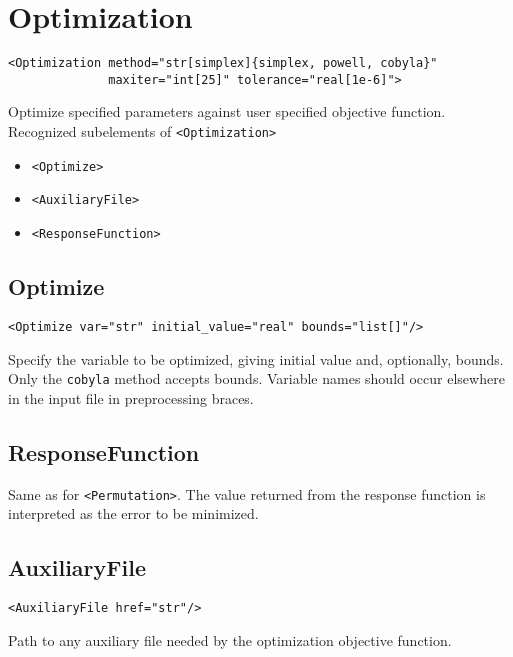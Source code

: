 \documentclass[11pt]{report}
\renewcommand{\tag}[1]{\texttt{<#1>}}
\begin{document}
\section{Optimization}
\begin{verbatim}
<Optimization method="str[simplex]{simplex, powell, cobyla}"
              maxiter="int[25]" tolerance="real[1e-6]">
\end{verbatim}
%
Optimize specified parameters against user specified objective function.
Recognized subelements of \tag{Optimization}

\begin{itemize}
  \item \tag{Optimize}
  \item \tag{AuxiliaryFile}
  \item \tag{ResponseFunction}
\end{itemize}

\subsection{Optimize}
\begin{verbatim}
<Optimize var="str" initial_value="real" bounds="list[]"/>
\end{verbatim}
%
Specify the variable to be optimized, giving initial value and, optionally,
bounds.  Only the \texttt{cobyla} method accepts bounds.  Variable names should
occur elsewhere in the input file in preprocessing braces.

\subsection{ResponseFunction}
Same as for \tag{Permutation}.  The value returned from the response function
is interpreted as the error to be minimized.

\subsection{AuxiliaryFile}
\begin{verbatim}
<AuxiliaryFile href="str"/>
\end{verbatim}
Path to any auxiliary file needed by the optimization objective function.
\end{document}
